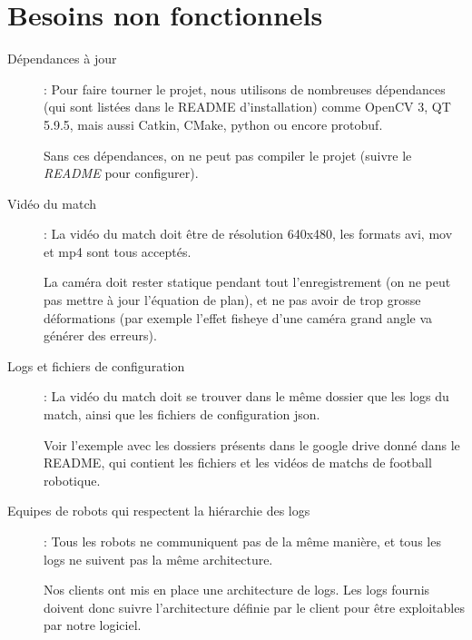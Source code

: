 \newpage

\section{Besoins non fonctionnels}

\begin{description}
    \item[Dépendances à jour]: Pour faire tourner le projet, nous
    utilisons de nombreuses dépendances (qui sont listées dans le
    README d'installation) comme OpenCV 3, QT 5.9.5, mais aussi 
    Catkin, CMake, python ou encore protobuf. 
    \bigskip
    
    Sans ces dépendances, on ne peut pas compiler le projet 
    (suivre le \textit{README} pour configurer).
    \bigskip
    
    \item[Vidéo du match]: La vidéo du match doit être de 
    résolution 640x480, les formats avi, mov et mp4 sont tous 
    acceptés. 
    \bigskip
    
    La caméra doit rester statique pendant tout l'enregistrement 
    (on ne peut pas mettre à jour l'équation de plan), et ne pas 
    avoir de trop grosse déformations (par exemple l'effet 
    fisheye d'une caméra grand angle va générer des erreurs).
    \bigskip
    
    \item[Logs et fichiers de configuration]: La vidéo du match 
    doit se trouver dans le même dossier que les logs du match, 
    ainsi que les fichiers de configuration json. 
    \bigskip
    
    Voir l'exemple avec les dossiers présents dans le google 
    drive donné dans le README, qui contient les fichiers et les 
    vidéos de matchs de football robotique.
    
    \item[Equipes de robots qui respectent la hiérarchie des 
    logs]: Tous les robots ne communiquent pas de la même 
    manière, et tous les logs ne suivent pas la même 
    architecture. 
    
    Nos clients ont mis en place une architecture de logs. Les 
    logs fournis doivent donc suivre l'architecture définie par 
    le client pour être exploitables par notre logiciel.
\end{description}

